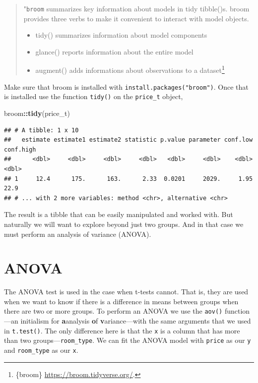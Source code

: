 \documentclass[
]{book}
\newenvironment{Shaded}{\begin{snugshade}}{\end{snugshade}}
\newcommand{\KeywordTok}[1]{\textcolor[rgb]{0.13,0.29,0.53}{\textbf{#1}}}
\newcommand{\NormalTok}[1]{#1}
\newcommand{\OperatorTok}[1]{\textcolor[rgb]{0.81,0.36,0.00}{\textbf{#1}}}
\providecommand{\tightlist}{%
  \setlength{\itemsep}{0pt}\setlength{\parskip}{0pt}}
\begin{document}
\begin{quote}
"\texttt{broom} summarizes key information about models in tidy tibble()s. broom provides three verbs to make it convenient to interact with model objects.

\begin{itemize}
\tightlist
\item
  tidy() summarizes information about model components
\item
  glance() reports information about the entire model
\item
  augment() adds informations about observations to a dataset\footnote{\{broom\} \url{https://broom.tidyverse.org/}.}
\end{itemize}
\end{quote}

Make sure that broom is installed with \texttt{install.packages("broom")}. Once that is installed use the function \texttt{tidy()} on the \texttt{price\_t} object,

\begin{Shaded}
\begin{Highlighting}[]
\NormalTok{broom}\OperatorTok{::}\KeywordTok{tidy}\NormalTok{(price\_t)}
\end{Highlighting}
\end{Shaded}

\begin{verbatim}
## # A tibble: 1 x 10
##   estimate estimate1 estimate2 statistic p.value parameter conf.low conf.high
##      <dbl>     <dbl>     <dbl>     <dbl>   <dbl>     <dbl>    <dbl>     <dbl>
## 1     12.4      175.      163.      2.33  0.0201     2029.     1.95      22.9
## # ... with 2 more variables: method <chr>, alternative <chr>
\end{verbatim}

The result is a tibble that can be easily manipulated and worked with. But naturally we will want to explore beyond just two groups. And in that case we must perform an analysis of variance (ANOVA).

\hypertarget{anova}{%
\section{ANOVA}\label{anova}}

The ANOVA test is used in the case when t-tests cannot. That is, they are used when we want to know if there is a difference in means between groups when there are two or more groups. To perform an ANOVA we use the \texttt{aov()} function---an initialism for \textbf{a}analysis \textbf{o}f \textbf{v}ariance---with the same arguments that we used in \texttt{t.test()}. The only difference here is that the \texttt{x} is a column that has more than two groups---\texttt{room\_type}. We can fit the ANOVA model with \texttt{price} as our \texttt{y} and \texttt{room\_type} as our \texttt{x}.
\end{document}
